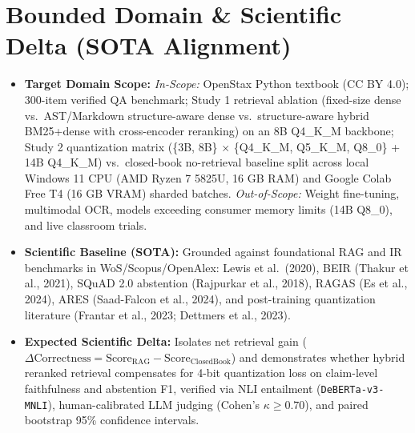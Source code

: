 \documentclass[10pt,a4paper]{article}
\begin{document}
\section{Bounded Domain \& Scientific Delta (SOTA Alignment)}
\begin{itemize}
    \item \textbf{Target Domain Scope:} \textit{In-Scope:} OpenStax Python textbook (CC BY 4.0); 300-item verified QA benchmark; Study 1 retrieval ablation (fixed-size dense vs.\ AST/Markdown structure-aware dense vs.\ structure-aware hybrid BM25+dense with cross-encoder reranking) on an 8B Q4\_K\_M backbone; Study 2 quantization matrix (\{3B, 8B\} $\times$ \{Q4\_K\_M, Q5\_K\_M, Q8\_0\} + 14B Q4\_K\_M) vs.\ closed-book no-retrieval baseline split across local Windows 11 CPU (AMD Ryzen 7 5825U, 16 GB RAM) and Google Colab Free T4 (16 GB VRAM) sharded batches. \textit{Out-of-Scope:} Weight fine-tuning, multimodal OCR, models exceeding consumer memory limits (14B Q8\_0), and live classroom trials.
    \item \textbf{Scientific Baseline (SOTA):} Grounded against foundational RAG and IR benchmarks in WoS/Scopus/OpenAlex: Lewis et al.\ (2020), BEIR (Thakur et al., 2021), SQuAD 2.0 abstention (Rajpurkar et al., 2018), RAGAS (Es et al., 2024), ARES (Saad-Falcon et al., 2024), and post-training quantization literature (Frantar et al., 2023; Dettmers et al., 2023).
    \item \textbf{Expected Scientific Delta:} Isolates net retrieval gain ($\Delta \text{Correctness} = \text{Score}_{\text{RAG}} - \text{Score}_{\text{ClosedBook}}$) and demonstrates whether hybrid reranked retrieval compensates for 4-bit quantization loss on claim-level faithfulness and abstention F1, verified via NLI entailment (\texttt{DeBERTa-v3-MNLI}), human-calibrated LLM judging (Cohen's $\kappa \ge 0.70$), and paired bootstrap 95\% confidence intervals.
\end{itemize}
\end{document}
